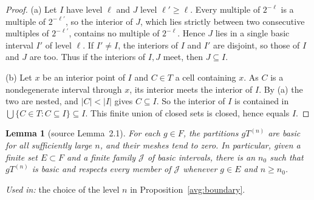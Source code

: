 \documentclass[11pt]{article}
\newtheorem{lemma}[theorem]{Lemma}
\theoremstyle{definition}
\numberwithin{equation}{section}
\begin{document}
\begin{proof}
(a) Let \(I\) have level \(\ell\) and \(J\) level \(\ell'\ge\ell\). Every
multiple of \(2^{-\ell}\) is a multiple of \(2^{-\ell'}\), so the interior
of \(J\), which lies strictly between two consecutive multiples of
\(2^{-\ell'}\), contains no multiple of \(2^{-\ell}\). Hence \(J\) lies in
a single basic interval \(I'\) of level \(\ell\). If \(I'\ne I\), the
interiors of \(I\) and \(I'\) are disjoint, so those of \(I\) and \(J\)
are too. Thus if the interiors of \(I,J\) meet, then \(J\subseteq I\).

(b) Let \(x\) be an interior point of \(I\) and \(C\in T\) a cell
containing \(x\). As \(C\) is a nondegenerate interval through \(x\), its
interior meets the interior of \(I\). By (a) the two are nested, and
\(|C|<|I|\) gives \(C\subseteq I\). So the interior of \(I\) is contained
in \(\bigcup\{C\in T:C\subseteq I\}\subseteq I\). This finite union of
closed sets is closed, hence equals \(I\).
\end{proof}

\begin{lemma}[source Lemma~2.1]\label{dyad:eventual}
For each \(g\in F\), the partitions \(gT^{(n)}\) are basic for all
sufficiently large \(n\), and their meshes tend to zero. In particular,
given a finite set \(E\subset F\) and a finite family \(\mathcal J\) of
basic intervals, there is an \(n_0\) such that \(gT^{(n)}\) is basic and
respects every member of \(\mathcal J\) whenever \(g\in E\) and
\(n\ge n_0\).
\end{lemma}
\noindent\emph{Used in:} the choice of the level \(n\) in
Proposition~\ref{avg:boundary}.
\end{document}
